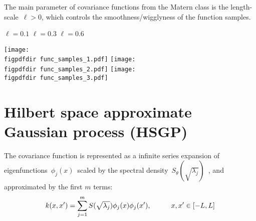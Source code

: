 \documentclass[landscape,a1,final]{a0poster} %
\let\tempone\itemize
\let\temptwo\enditemize
\renewenvironment{itemize}{\tempone\addtolength{\itemsep}{-0.3\baselineskip}}{\temptwo}
\def\figpdfdir{fig/} %
\begin{document}
\begin{minipage}{1\linewidth}
\begin{minipage}[t]{0.30\linewidth}
\begin{itemize}
\item The main parameter of covariance functions from the Matern class is the {\color{navyblue} length-scale}\, $\ell > 0$, which controls the {\color{navyblue} smoothness/wigglyness} of the function samples.

\end{itemize}

\begin{flushleft}
\hspace{40mm} $\ell=0.1$ \hspace{48mm} $\ell=0.3$ \hspace{47mm} $\ell=0.6$
\end{flushleft}
\vspace{-3mm}
\texttt{[image: \\figpdfdir func\_samples\_1.pdf]}
\texttt{[image: \\figpdfdir func\_samples\_2.pdf]}
\texttt{[image: \\figpdfdir func\_samples\_3.pdf]}





\end{minipage}%
\hspace{0.015\linewidth} 
\begin{minipage}[t]{0.31\textwidth}
\vspace{0pt}
\setlength{\parindent}{10mm}


\vspace{0.3cm}
\section{Hilbert space approximate Gaussian process (HSGP)}
\vspace{-0.2cm}

\begin{itemize}\setlength\itemsep{3mm}

\item The covariance function is represented as a {\color{navyblue} infinite series expansion} of eigenfunctions\, $\phi_j(x)$\, scaled by the spectral density\, $S_{\theta}(\sqrt{\lambda_j})$\, {\color{darkgray} \citep{solin2018hilbert}}, and {\color{navyblue} approximated by the first $m$ terms}:
%
\begin{align*}
k(x,x') = \sum_{j=1}^m S(\sqrt{\lambda_j}) \phi_j(x) \phi_j(x'), \hspace{10mm} x,x' \in [-L,L]
\end{align*} 


\end{itemize}
\end{minipage}
\end{minipage}
\end{document}
